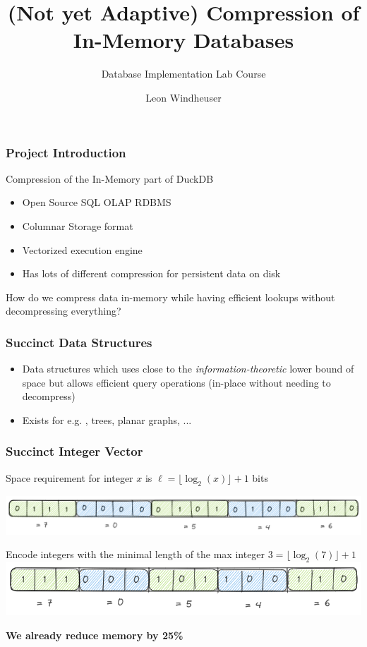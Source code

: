 \documentclass{beamer}
\title{(Not yet Adaptive) Compression of In-Memory Databases}
\subtitle{Database Implementation Lab Course}
\author{Leon Windheuser}
\begin{document}
\frame{\titlepage}


\begin{frame}
    \frametitle{Project Introduction}
    Compression of the In-Memory part of DuckDB
    \vspace{1cm}
    \pause

    \begin{itemize}
        \item Open Source SQL OLAP RDBMS 
        \item Columnar Storage format
        \item Vectorized execution engine
        \item Has lots of different compression for persistent data on disk 
    \end{itemize}

    \vspace{1cm}
    \pause
    How do we compress data in-memory while having efficient lookups without decompressing everything?
\end{frame}


\begin{frame}
    \frametitle{Succinct Data Structures}
    
    \begin{itemize}
        \item Data structures which uses close to the \textit{information-theoretic} lower bound of space but 
    allows efficient query operations (in-place without needing to decompress)
        \item Exists for e.g. {}, trees, planar graphs, ...
    \end{itemize}
\end{frame}


\begin{frame}
    \frametitle{Succinct Integer Vector}
    \centering
    Space requirement for integer $x$ is $\ell = \lfloor \log_2(x) \rfloor + 1$ bits

    \includegraphics[width=\framewidth]{figures/excalidraw/bit-int-vector.png}
    \pause

    Encode integers with the minimal length of the max integer $3 = \lfloor \log_2(7) \rfloor + 1$ \\
    \vspace{0.5cm} 
    \includegraphics[width=0.75\framewidth]{figures/excalidraw/bit-compressed-int-vector.png}

    \vspace{0.5cm}
    \textbf{We already reduce memory by 25\%}
\end{frame}
\end{document}
